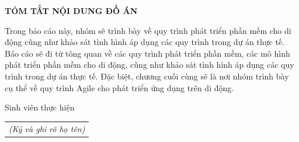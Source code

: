 \documentclass[../DoAn.tex]{subfiles}
\begin{document}
\begin{center}
    \Large{\textbf{TÓM TẮT NỘI DUNG ĐỒ ÁN}}\\
\end{center}
\vspace{1cm}
Trong báo cáo này, nhóm sẽ trình bày về quy trình phát triển phần mềm cho di động cũng như khảo sát tình hình áp dụng các quy trình trong dự án thực tế. Báo cáo sẽ đi từ tông quan về các quy trình phát triển phần mềm, các mô hình phát triển phần mềm cho di động, cũng như khảo sát tình hình áp dụng các quy trình trong dự án thực tế. Đặc biệt, chương cuối cùng sẽ là nơi nhóm trình bày cụ thể về quy trình Agile cho phát triển ứng dụng trên di động.
\begin{flushright}
Sinh viên thực hiện\\
\begin{tabular}{@{}c@{}}
\textit{(Ký và ghi rõ họ tên)}
\end{tabular}
\end{flushright}
\end{document}
